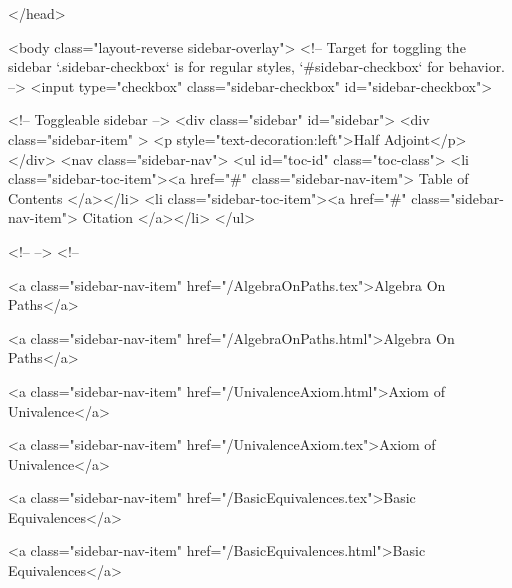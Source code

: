   
</head>




  <body class="layout-reverse sidebar-overlay">
    <!-- Target for toggling the sidebar `.sidebar-checkbox` is for regular
     styles, `#sidebar-checkbox` for behavior. -->
<input type="checkbox" class="sidebar-checkbox" id="sidebar-checkbox">

<!-- Toggleable sidebar -->
<div class="sidebar" id="sidebar">
  <div class="sidebar-item" >
    <p style="text-decoration:left">Half Adjoint</p>
  </div>
  <nav class="sidebar-nav">
    <ul id="toc-id" class="toc-class">
  <li class="sidebar-toc-item"><a href="#" class="sidebar-nav-item"> Table of Contents </a></li>
  <li class="sidebar-toc-item"><a href="#" class="sidebar-nav-item"> Citation </a></li>
</ul>


    <!--  -->
    <!-- 
      
    
      
    
      
    
      
    
      
        
      
    
      
        
          <a class="sidebar-nav-item" href="/AlgebraOnPaths.tex">Algebra On Paths</a>
        
      
    
      
        
          <a class="sidebar-nav-item" href="/AlgebraOnPaths.html">Algebra On Paths</a>
        
      
    
      
        
          <a class="sidebar-nav-item" href="/UnivalenceAxiom.html">Axiom of Univalence</a>
        
      
    
      
        
          <a class="sidebar-nav-item" href="/UnivalenceAxiom.tex">Axiom of Univalence</a>
        
      
    
      
        
          <a class="sidebar-nav-item" href="/BasicEquivalences.tex">Basic Equivalences</a>
        
      
    
      
        
          <a class="sidebar-nav-item" href="/BasicEquivalences.html">Basic Equivalences</a>
        
